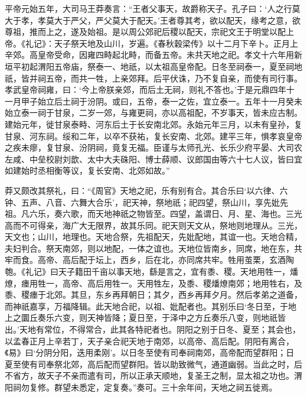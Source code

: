 \documentclass[12pt,UTF8]{ctexbook}
\begin{document}
平帝元始五年，大司马王莽奏言：“王者父事天，故爵称天子。孔子曰：‘人之行莫大于孝，孝莫大于严父，严父莫大于配天。’王者尊其考，欲以配天，缘考之意，欲尊祖，推而上之，遂及始祖。是以周公郊祀后稷以配天，宗祀文王于明堂以配上帝。《礼记》：天子祭天地及山川，岁遍。《春秋穀梁传》以十二月下辛卜。正月上辛郊。高皇帝受命，因雍四畤起北畤，而备五帝。未共天地之祀。孝文十六年用新垣平初起渭阳五帝庙，祭泰一、地祇，以太祖高皇帝配。日冬至祠泰一，夏至祠地祇，皆并祠五帝，而共一牲，上亲郊拜。后平伏诛，乃不复自亲，而使有司行事。孝武皇帝祠雍，曰：‘今上帝朕亲郊，而后土无祠，则礼不答也。’于是元鼎四年十一月甲子始立后土祠于汾阴。或曰，五帝，泰一之佐，宜立泰一。五年十一月癸未始立泰一祠于甘泉，二岁一郊，与雍更祠，亦以高祖配，不岁事天，皆未应古制。建始元年，徙甘泉泰畤、河东后土于长安南北郊。永始元年三月，以未有皇孙，复甘泉、河东祠。绥和二年，以卒不获祐，复长安南、北郊。建平三年，惧孝哀皇帝之疾未瘳，复甘泉、汾阴祠，竟复无福。臣谨与太师孔光、长乐少府平晏、大司农左咸、中垒校尉刘歆、太中大夫硃阳、博士薛顺、议郎国由等六十七人议，皆曰宜如建始时丞相衡等议，复长安南、北郊如故。”



莽又颇改其祭礼，曰：“《周官》天地之祀，乐有别有合。其合乐曰‘以六律、六钟、五声、八音、六舞大合乐’，祀天神，祭地祇；祀四望，祭山川，享先妣先祖。凡六乐，奏六歌，而天地神祇之物皆至。四望，盖谓日、月、星、海也。三光高而不可得亲，海广大无限界，故其乐同。祀天则天文从，祭地则地理从。三光，天文也；山川，地理也。天地合祭，先祖配天，先妣配地，其谊一也。天地合精，夫妇判合。祭天南郊，则以地配，一体之谊也。天地位皆南乡，同席，地在东，共牢而食。高帝、高后配于坛上，西乡，后在北，亦同席共牢。牲用茧栗，玄酒陶匏。《礼记》曰天子籍田千亩以事天地，繇是言之，宜有黍、稷。天地用牲一，燔燎，瘗用牲一，高帝、高后用牲一。天用牲左，及黍、稷燔燎南郊；地用牲右，及黍、稷瘗于北郊。其旦，东乡再拜朝日；其夕，西乡再拜夕月。然后孝弟之道备，而神祇嘉享，万福降辑。此天地合祀，以祖、妣配者也。其别乐曰‘冬日至，于地上之圜丘奏乐六变，则天神皆降；夏日至，于泽中之方丘奏乐八变，则地祇皆出。’天地有常位，不得常合，此其各特祀者也。阴阳之别于日冬、夏至；其会也，以孟春正月上辛若丁，天子亲合祀天地于南郊，以高帝、高后配。阴阳有离合，《易》曰‘分阴分阳，迭用柔刚’。以日冬至使有司奉祠南郊，高帝配而望群阳；日夏至使有司奉祭北郊，高后配而望群阳。皆以助致微气，通道幽弱。当此之时，后不省方，故天子不亲而遣有司，所以正承天顺地，复圣王之制，显太祖之功也。渭阳祠勿复修。群望未悉定，定复奏。”奏可。三十余年间，天地之祠五徙焉。
\end{document}
